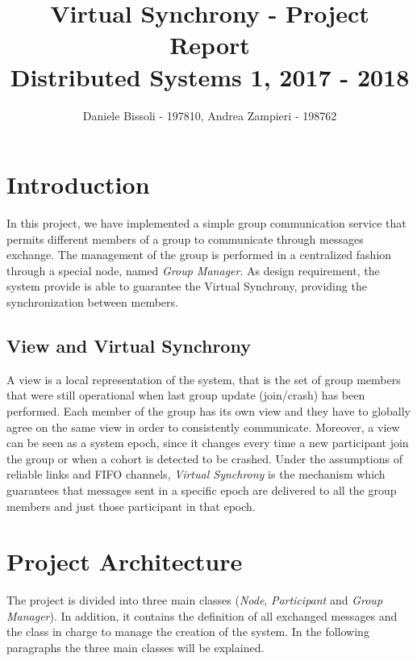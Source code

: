 \documentclass[11pt]{article}
\title{\LARGE{\textbf{Virtual Synchrony - Project Report}\\[0mm]\large{Distributed Systems 1, 2017 - 2018}}}
\author{Daniele Bissoli - 197810, Andrea Zampieri - 198762}
\date{}
\begin{document}
	\maketitle
	
	\section{Introduction}
	In this project, we have implemented a simple group communication service that permits different members of a group to communicate through messages exchange. The management of the group is performed in a centralized fashion through a special node, named \textit{Group Manager}. As design requirement, the system provide is able to guarantee the Virtual Synchrony, providing the synchronization between members.
	
	\subsection{View and Virtual Synchrony}
	A view is a local representation of the system, that is the set of group members that were still operational when last group update (join/crash) has been performed. Each member of the group has its own view and they have to globally agree on the same view in order to consistently communicate. Moreover, a view can be seen as a system epoch, since it changes every time a new participant join the group or when a cohort is detected to be crashed.
	Under the assumptions of reliable links and FIFO channels, \textit{Virtual Synchrony} is the mechanism which guarantees that messages sent in a specific epoch are delivered to all the group members and just those participant in that epoch.
	
	\section{Project Architecture}
	The project is divided into three main classes (\textit{Node}, \textit{Participant} and \textit{Group Manager}). In addition, it contains the definition of all exchanged messages and the class in charge to manage the creation of the system. In the following paragraphs the three main classes will be explained.
	
\end{document}
